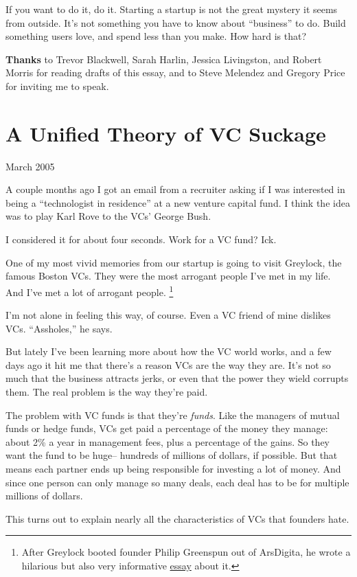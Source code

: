 \documentclass[12pt]{book}
\begin{document}
If you want to do it, do it. Starting a startup is not the great mystery
it seems from outside. It's not something you have to know about
``business'' to do. Build something users love, and spend less than you
make. How hard is that?


\textbf{Thanks} to Trevor Blackwell, Sarah Harlin, Jessica Livingston,
and Robert Morris for reading drafts of this essay, and to Steve
Melendez and Gregory Price for inviting me to speak.
\chapter{A Unified Theory of VC Suckage}

March 2005

A couple months ago I got an email from a recruiter asking if I was
interested in being a ``technologist in residence'' at a new venture
capital fund. I think the idea was to play Karl Rove to the VCs' George
Bush.

I considered it for about four seconds. Work for a VC fund? Ick.

One of my most vivid memories from our startup is going to visit
Greylock, the famous Boston VCs. They were the most arrogant people I've
met in my life. And I've met a lot of arrogant people. \footnote{After Greylock booted founder Philip Greenspun out of ArsDigita,
he wrote a hilarious but also very informative
\href{http://www.waxy.org/random/arsdigita/}{essay} about it.}

I'm not alone in feeling this way, of course. Even a VC friend of mine
dislikes VCs. ``Assholes,'' he says.

But lately I've been learning more about how the VC world works, and a
few days ago it hit me that there's a reason VCs are the way they are.
It's not so much that the business attracts jerks, or even that the
power they wield corrupts them. The real problem is the way they're
paid.

The problem with VC funds is that they're \emph{funds}. Like the
managers of mutual funds or hedge funds, VCs get paid a percentage of
the money they manage: about 2\% a year in management fees, plus a
percentage of the gains. So they want the fund to be huge-- hundreds of
millions of dollars, if possible. But that means each partner ends up
being responsible for investing a lot of money. And since one person can
only manage so many deals, each deal has to be for multiple millions of
dollars.

This turns out to explain nearly all the characteristics of VCs that
founders hate.
\end{document}
